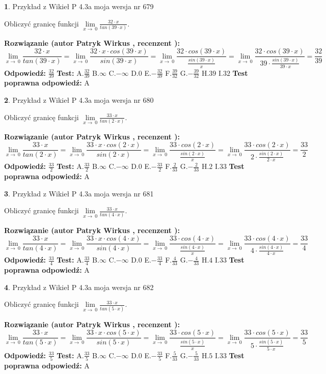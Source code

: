 \documentclass[12pt, a4paper]{article}
\theoremstyle{definition} %
\newtheorem{zad}{}
\newcommand{\zadStart}[1]{\begin{zad}#1\newline}
\newcommand{\zadStop}{\end{zad}}
\newcommand{\rozwStart}[2]{\noindent \textbf{Rozwiązanie (autor #1 , recenzent #2): }\newline}
\newcommand{\rozwStop}{\newline}
\newcommand{\odpStart}{\noindent \textbf{Odpowiedź:}\newline}
\newcommand{\odpStop}{\newline}
\newcommand{\testStart}{\noindent \textbf{Test:}\newline}
\newcommand{\testStop}{\newline}
\newcommand{\kluczStart}{\noindent \textbf{Test poprawna odpowiedź:}\newline}
\newcommand{\kluczStop}{\newline}
\begin{document}
\zadStart{Przykład z Wikieł P 4.3a moja wersja nr 679}


Obliczyć granicę funkcji $\lim\limits_{x\to\ 0}\frac{32 \cdot x}{tan(39 \cdot x)}$.
\zadStop
\rozwStart{Patryk Wirkus}{}
$$\lim\limits_{x\to\ 0}\frac{32 \cdot x}{tan(39 \cdot x)}=\lim\limits_{x\to\ 0}\frac{32 \cdot x \cdot cos(39 \cdot x)}{sin(39 \cdot x)}=\lim\limits_{x\to\ 0}\frac{32 \cdot cos(39 \cdot x)}{\frac{sin(39 \cdot x)}{x}}=\lim\limits_{x\to\ 0}\frac{32 \cdot cos(39 \cdot x)}{39 \cdot \frac{sin(39 \cdot x)}{39 \cdot x}} = \frac{32}{39}$$
\rozwStop
\odpStart
$\frac{32}{39}$
\odpStop
\testStart
A.$\frac{32}{39}$
B.$\infty$
C.$-\infty$
D.$0$
E.$-\frac{32}{39}$
F.$\frac{39}{32}$
G.$-\frac{39}{32}$
H.$39$
I.$32$
\testStop
\kluczStart
A
\kluczStop



\zadStart{Przykład z Wikieł P 4.3a moja wersja nr 680}


Obliczyć granicę funkcji $\lim\limits_{x\to\ 0}\frac{33 \cdot x}{tan(2 \cdot x)}$.
\zadStop
\rozwStart{Patryk Wirkus}{}
$$\lim\limits_{x\to\ 0}\frac{33 \cdot x}{tan(2 \cdot x)}=\lim\limits_{x\to\ 0}\frac{33 \cdot x \cdot cos(2 \cdot x)}{sin(2 \cdot x)}=\lim\limits_{x\to\ 0}\frac{33 \cdot cos(2 \cdot x)}{\frac{sin(2 \cdot x)}{x}}=\lim\limits_{x\to\ 0}\frac{33 \cdot cos(2 \cdot x)}{2 \cdot \frac{sin(2 \cdot x)}{2 \cdot x}} = \frac{33}{2}$$
\rozwStop
\odpStart
$\frac{33}{2}$
\odpStop
\testStart
A.$\frac{33}{2}$
B.$\infty$
C.$-\infty$
D.$0$
E.$-\frac{33}{2}$
F.$\frac{2}{33}$
G.$-\frac{2}{33}$
H.$2$
I.$33$
\testStop
\kluczStart
A
\kluczStop



\zadStart{Przykład z Wikieł P 4.3a moja wersja nr 681}


Obliczyć granicę funkcji $\lim\limits_{x\to\ 0}\frac{33 \cdot x}{tan(4 \cdot x)}$.
\zadStop
\rozwStart{Patryk Wirkus}{}
$$\lim\limits_{x\to\ 0}\frac{33 \cdot x}{tan(4 \cdot x)}=\lim\limits_{x\to\ 0}\frac{33 \cdot x \cdot cos(4 \cdot x)}{sin(4 \cdot x)}=\lim\limits_{x\to\ 0}\frac{33 \cdot cos(4 \cdot x)}{\frac{sin(4 \cdot x)}{x}}=\lim\limits_{x\to\ 0}\frac{33 \cdot cos(4 \cdot x)}{4 \cdot \frac{sin(4 \cdot x)}{4 \cdot x}} = \frac{33}{4}$$
\rozwStop
\odpStart
$\frac{33}{4}$
\odpStop
\testStart
A.$\frac{33}{4}$
B.$\infty$
C.$-\infty$
D.$0$
E.$-\frac{33}{4}$
F.$\frac{4}{33}$
G.$-\frac{4}{33}$
H.$4$
I.$33$
\testStop
\kluczStart
A
\kluczStop



\zadStart{Przykład z Wikieł P 4.3a moja wersja nr 682}


Obliczyć granicę funkcji $\lim\limits_{x\to\ 0}\frac{33 \cdot x}{tan(5 \cdot x)}$.
\zadStop
\rozwStart{Patryk Wirkus}{}
$$\lim\limits_{x\to\ 0}\frac{33 \cdot x}{tan(5 \cdot x)}=\lim\limits_{x\to\ 0}\frac{33 \cdot x \cdot cos(5 \cdot x)}{sin(5 \cdot x)}=\lim\limits_{x\to\ 0}\frac{33 \cdot cos(5 \cdot x)}{\frac{sin(5 \cdot x)}{x}}=\lim\limits_{x\to\ 0}\frac{33 \cdot cos(5 \cdot x)}{5 \cdot \frac{sin(5 \cdot x)}{5 \cdot x}} = \frac{33}{5}$$
\rozwStop
\odpStart
$\frac{33}{5}$
\odpStop
\testStart
A.$\frac{33}{5}$
B.$\infty$
C.$-\infty$
D.$0$
E.$-\frac{33}{5}$
F.$\frac{5}{33}$
G.$-\frac{5}{33}$
H.$5$
I.$33$
\testStop
\kluczStart
A
\kluczStop
\end{document}
